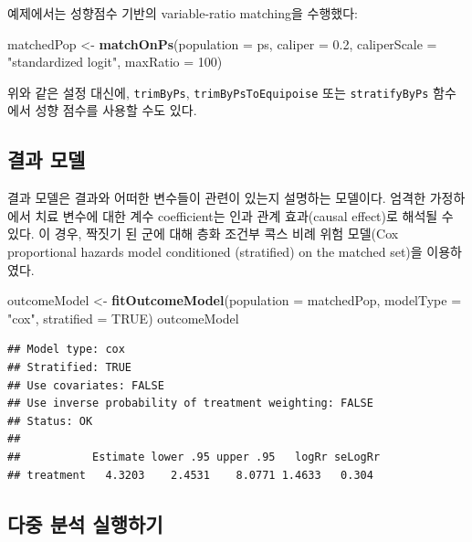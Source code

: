 \documentclass[11pt]{book}
\newenvironment{Shaded}{\begin{snugshade}}{\end{snugshade}}
\newcommand{\KeywordTok}[1]{\textcolor[rgb]{0.13,0.29,0.53}{\textbf{#1}}}
\newcommand{\DataTypeTok}[1]{\textcolor[rgb]{0.13,0.29,0.53}{#1}}
\newcommand{\DecValTok}[1]{\textcolor[rgb]{0.00,0.00,0.81}{#1}}
\newcommand{\FloatTok}[1]{\textcolor[rgb]{0.00,0.00,0.81}{#1}}
\newcommand{\StringTok}[1]{\textcolor[rgb]{0.31,0.60,0.02}{#1}}
\newcommand{\OtherTok}[1]{\textcolor[rgb]{0.56,0.35,0.01}{#1}}
\newcommand{\NormalTok}[1]{#1}
\theoremstyle{definition}
\theoremstyle{definition}
\theoremstyle{definition}
\theoremstyle{remark}
\begin{document}
예제에서는 성향점수 기반의 variable-ratio matching을 수행했다:

\begin{Shaded}
\begin{Highlighting}[]
\NormalTok{matchedPop <-}\StringTok{ }\KeywordTok{matchOnPs}\NormalTok{(}\DataTypeTok{population =}\NormalTok{ ps, }\DataTypeTok{caliper =} \FloatTok{0.2}\NormalTok{,}
                        \DataTypeTok{caliperScale =} \StringTok{"standardized logit"}\NormalTok{, }\DataTypeTok{maxRatio =} \DecValTok{100}\NormalTok{)}
\end{Highlighting}
\end{Shaded}

위와 같은 설정 대신에, \texttt{trimByPs}, \texttt{trimByPsToEquipoise}
또는 \texttt{stratifyByPs} 함수에서 성향 점수를 사용할 수도 있다.

\subsection{결과 모델}\label{-}

결과 모델은 결과와 어떠한 변수들이 관련이 있는지 설명하는 모델이다.
엄격한 가정하에서 치료 변수에 대한 계수 coefficient는 인과 관계
효과(causal effect)로 해석될 수 있다. 이 경우, 짝짓기 된 군에 대해 층화
조건부 콕스 비례 위험 모델(Cox proportional hazards model conditioned
(stratified) on the matched set)을 이용하였다.

\begin{Shaded}
\begin{Highlighting}[]
\NormalTok{outcomeModel <-}\StringTok{ }\KeywordTok{fitOutcomeModel}\NormalTok{(}\DataTypeTok{population =}\NormalTok{ matchedPop,}
                                \DataTypeTok{modelType =} \StringTok{"cox"}\NormalTok{,}
                                \DataTypeTok{stratified =} \OtherTok{TRUE}\NormalTok{)}
\NormalTok{outcomeModel}
\end{Highlighting}
\end{Shaded}

\begin{verbatim}
## Model type: cox
## Stratified: TRUE
## Use covariates: FALSE
## Use inverse probability of treatment weighting: FALSE
## Status: OK
## 
##           Estimate lower .95 upper .95   logRr seLogRr
## treatment   4.3203    2.4531    8.0771 1.4633   0.304
\end{verbatim}

\subsection{다중 분석 실행하기}\label{MultipleAnalyses}
\end{document}
